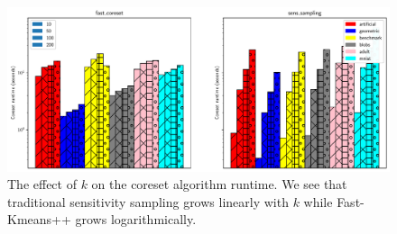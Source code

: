 \begin{figure}
    \centering
    \includegraphics[width=.95\linewidth]{images/2/coreset_runtime-Effect_of_k_for_sens_sampling.pdf}
    \caption{
        The effect of $k$ on the coreset algorithm runtime. We see that traditional sensitivity sampling grows linearly with $k$ while Fast-Kmeans++ grows
        logarithmically.
    }
    \label{fig:k_on_runtime}
\end{figure}
